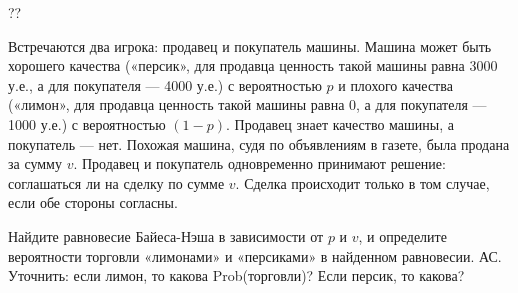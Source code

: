 \begin{problem}\par
\begin{source} \cite{slanthcev:gt}??\end{source}
Встречаются два игрока: продавец и покупатель машины. Машина может быть хорошего качества («персик», для продавца ценность такой машины равна 3000 у.е., а для покупателя — 4000 у.е.) с вероятностью  $p$  и плохого качества («лимон», для продавца ценность такой машины равна 0, а для покупателя — 1000 у.е.) с вероятностью  $\left(1-p\right)$. Продавец знает качество машины, а покупатель — нет. Похожая машина, судя по объявлениям в газете, была продана за сумму  $v$. Продавец и покупатель одновременно принимают решение: соглашаться ли на сделку по сумме  $v$. Сделка происходит только в том случае, если обе стороны согласны.\par
Найдите равновесие Байеса-Нэша в зависимости от  $p$  и  $v$,  и определите вероятности торговли «лимонами» и «персиками» в найденном равновесии.
{\red АС. Уточнить: если лимон, то какова Prob(торговли)? Если персик, то какова?}


\begin{sol}

\end{sol}
\end{problem}



